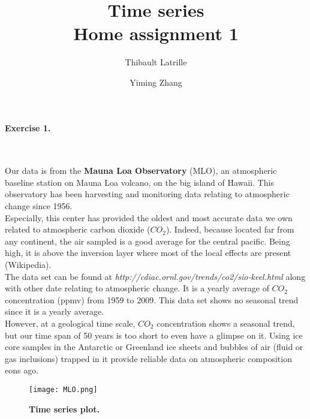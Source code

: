 \documentclass{article}
\author{Thibault Latrille \and Yiming Zhang}
\title{Time series
 \\ Home assignment 1}
\begin{document}
\maketitle

\paragraph{Exercise 1.}
\

Our data is from the \textbf{Mauna Loa Observatory} (MLO), an atmospheric baseline station on Mauna Loa volcano, on the big island of Hawaii. 
This observatory has been harvesting and monitoring data relating to atmospheric change since 1956. \\

Especially, this center has provided the oldest and most accurate data we own related to atmospheric carbon dioxide ($CO_2$). Indeed, because located far from any continent, the air sampled is a good average for the central pacific. Being high, it is above the inversion layer where most of the local effects are present (Wikipedia). 
\\


The data set can be found at \textit{http://cdiac.ornl.gov/trends/co2/sio-keel.html} along with other date relating to atmospheric change. It is a yearly average of $CO_2$ concentration (ppmv) from 1959 to 2009. This data set shows  no seasonal trend since it is a yearly average. \\

However, at a geological time scale, $CO_2$ concentration shows a seasonal trend, but our time span of 50 years is too short to even have a glimpse on it. Using ice core samples in the Antarctic or Greenland ice sheets and bubbles of air (fluid or gas inclusions) trapped in it provide reliable data on atmospheric composition eons ago.

\begin{figure}[H]
	  \centering
  	\texttt{[image: MLO.png]}
  	\caption{\textbf{Time series plot.} }
	\end{figure}
\end{document}
